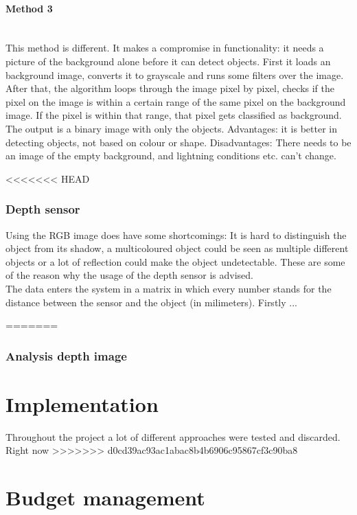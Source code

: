 \documentclass{article}
\begin{document}
\paragraph{Method 3}\mbox{}\\
This method is different. It makes a compromise in functionality: it needs a picture of the background alone before it can detect objects. First it loads an background image, converts it to grayscale and runs some filters over the image. After that, the algorithm loops through the image pixel by pixel, checks if the pixel on the image is within a certain range of the same pixel on the background image. If the pixel is within that range, that pixel gets classified as background. The output is a binary image with only the objects.  
Advantages: it is better in detecting objects, not based on colour or shape.
Disadvantages: There needs to be an image of the empty background, and lightning conditions etc. can’t change.

\newpage

<<<<<<< HEAD
\subsubsection{Depth sensor}
Using the RGB image does have some shortcomings: It is hard to distinguish the object from its shadow, a multicoloured object could be seen as multiple different objects or a lot of reflection could make the object undetectable. These are some of the reason why the usage of the depth sensor is advised.
\\

The data enters the system in a matrix in which every number stands for the distance between the sensor and the object (in milimeters). Firstly ...  

     

=======
\subsubsection{Analysis depth image}

\section{Implementation}
Throughout the project a lot of different approaches were tested and discarded. Right now 
>>>>>>> d0cd39ac93ac1abac8b4b6906c95867cf3c90ba8

\section{Budget management}
\end{document}
